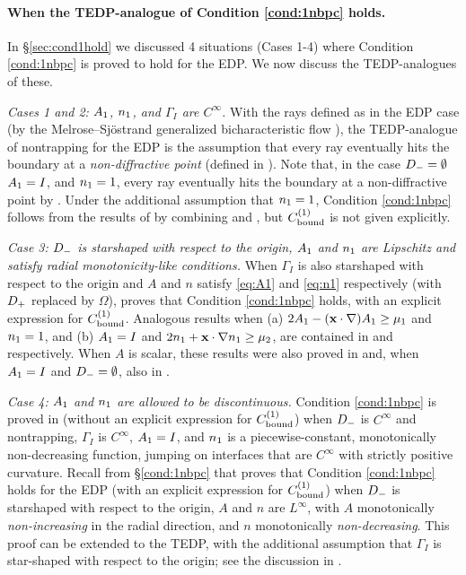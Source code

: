 \paragraph{When the TEDP-analogue of Condition \ref{cond:1nbpc} holds.}

In \S\ref{sec:cond1hold} we discussed 4 situations (Cases 1-4) where Condition \ref{cond:1nbpc} is proved to hold for the EDP. We now discuss the TEDP-analogues of these.

\emph{Cases 1 and 2: $A_{1}$, $n_{1}$, and $\Gamma_I$  are $C^\infty$.} 
With the rays defined as in the EDP case (by the Melrose--Sj{\"o}strand generalized bicharacteristic flow 
\cite[\S24.3]{Ho:85}), the TEDP-analogue of nontrapping for the EDP is the assumption that 
every ray eventually hits the boundary at a \emph{non-diffractive point} (defined in \cite[Page 1037]{BaLeRa:92}). Note that, in the case $D_{-}=\emptyset$ $A_{1}= I$, and $n_{1}=1$, every ray eventually hits the boundary at a non-diffractive point by \cite[Lemma 5.3]{BaSpWu:16}.
Under the additional assumption that $n_{1}= 1$, Condition \ref{cond:1nbpc} follows from the results of \cite{BaLeRa:92} by combining \cite[Theorem 1.8]{BaSpWu:16} and \cite[Remark 5.6]{BaSpWu:16}, but $C^{(1)}_{\rm bound}$ is not given explicitly.

\emph{Case 3: $D_{-}$ is starshaped with respect to the origin, $A_{1}$ and $n_{1}$ are Lipschitz and satisfy radial monotonicity-like conditions.}
When $\Gamma_I$ is also starshaped with respect to the origin and $A$ and $n$ satisfy \eqref{eq:A1} and \eqref{eq:n1} respectively (with $D_{+}$ replaced by $\Omega$), 
\cite[Theorem A.6(i)]{GrPeSp:19} proves that
Condition \ref{cond:1nbpc} holds, with an explicit expression for $C^{(1)}_{\rm bound}$. Analogous results when (a) $2A_{1} - (\mathbf{x}\cdot\nabla)A_{1} \geq \mu_1$ and $n_{1}= 1$,
and  (b) $A_{1}= I$ and  $2n_{1} + \mathbf{x} \cdot \nabla n_{1} \geq \mu_2$, 
are contained in \cite[Theorem A.6(ii)]{GrPeSp:19} and \cite[Theorem A.6(iii)]{GrPeSp:19} respectively.
When $A$ is scalar, these results were also proved in \cite[Theorem 1]{BrGaPe:17} and, when $A_{1}= I$ and $D_{-}=\emptyset$, also in \cite[Theorem 3.2]{GrSa:18}.

\emph{Case 4: %
 $A_{1}$ and $n_{1}$ are allowed to be discontinuous.}
Condition \ref{cond:1nbpc} is proved in \cite{CaVo:10} (without an explicit expression for $C^{(1)}_{\rm bound}$) when $D_{-}$ is $C^\infty$ and nontrapping, $\Gamma_I$ is $C^\infty$, $A_{1}= I $, and $n_{1}$ is a piecewise-constant, monotonically non-decreasing function, jumping on interfaces that are $C^\infty$ with strictly positive curvature.
Recall from \S\ref{cond:1nbpc} that \cite[Theorem 2.7]{GrPeSp:19} proves that Condition \ref{cond:1nbpc} holds for the EDP (with an explicit expression for $C^{(1)}_{\rm bound}$) when $D_{-}$ is starshaped with respect to the origin, $A$ and $n$ are $L^\infty$, with $A$ monotonically \emph{non-increasing} in the radial direction, and $n$ monotonically \emph{non-decreasing}. This proof can be extended to the TEDP, with the additional assumption that $\Gamma_I$ is star-shaped with respect to the origin; see the discussion in \cite[Section A.2]{GrPeSp:19}.

